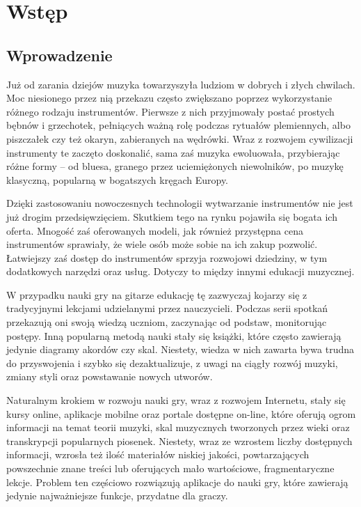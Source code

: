 \chapter{Wstęp}

\section{Wprowadzenie}
Już od zarania dziejów muzyka towarzyszyła ludziom w dobrych i złych chwilach. Moc niesionego przez nią przekazu często zwiększano poprzez wykorzystanie różnego rodzaju instrumentów. Pierwsze z nich przyjmowały postać prostych bębnów i grzechotek, pełniących ważną rolę podczas rytuałów plemiennych, albo piszczałek czy też okaryn, zabieranych na wędrówki. Wraz z rozwojem cywilizacji instrumenty te zaczęto doskonalić, sama zaś muzyka ewoluowała, przybierając różne formy -- od bluesa, granego przez uciemiężonych niewolników, po muzykę klasyczną, popularną w bogatszych kręgach Europy. 


Dzięki zastosowaniu nowoczesnych technologii wytwarzanie instrumentów nie jest już drogim przedsięwzięciem. Skutkiem tego na rynku pojawiła się bogata ich oferta. Mnogość zaś oferowanych modeli, jak również przystępna cena  instrumentów sprawiały, że wiele osób może sobie na ich zakup pozwolić. Łatwiejszy zaś dostęp do instrumentów sprzyja rozwojowi dziedziny, w tym dodatkowych narzędzi oraz usług. Dotyczy to między innymi edukacji muzycznej.

W przypadku nauki gry na gitarze edukację tę zazwyczaj kojarzy się z tradycyjnymi lekcjami udzielanymi przez nauczycieli. Podczas serii spotkań przekazują oni swoją wiedzą uczniom, zaczynając od podstaw, monitorując postępy. Inną popularną metodą nauki stały się książki, które często zawierają jedynie diagramy akordów czy skal. Niestety, wiedza w nich zawarta bywa trudna do przyswojenia i szybko się dezaktualizuje, z uwagi na ciągły rozwój muzyki, zmiany styli oraz powstawanie nowych utworów.

Naturalnym krokiem w rozwoju nauki gry, wraz z rozwojem Internetu, stały się kursy online, aplikacje mobilne oraz portale dostępne on-line, które oferują ogrom informacji na temat teorii muzyki, skal muzycznych tworzonych przez wieki oraz transkrypcji popularnych piosenek. Niestety, wraz ze wzrostem liczby dostępnych informacji, wzrosła też ilość materiałów niskiej jakości, powtarzających powszechnie znane treści lub oferujących mało wartościowe, fragmentaryczne lekcje. Problem ten częściowo rozwiązują aplikacje do nauki gry, które zawierają jedynie najważniejsze funkcje, przydatne dla graczy.

